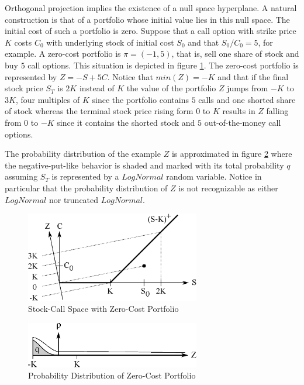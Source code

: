 Orthogonal projection implies the existence of a null space hyperplane. A natural construction is that of a portfolio whose initial value lies in this null space. The initial cost of such a portfolio is zero. Suppose that a call option with strike price $K$ costs $C_0$ with underlying stock of initial cost $S_0$ and that $S_0 / C_0 = 5$, for example. A zero-cost portfolio is $\pi = (-1,5)$, that is, sell one share of stock and buy $5$ call options. This situation is depicted in figure \ref{fig:SC_Zero}. The zero-cost portfolio is represented by $Z = -S + 5C$. Notice that $min(Z) = -K$ and that if the final stock price $S_T$ is $2K$ instead of $K$ the value of the portfolio $Z$ jumps from $-K$ to $3K$, four multiples of $K$ since the portfolio contains $5$ calls and one shorted share of stock whereas the terminal stock price rising form $0$ to $K$ results in $Z$ falling from $0$ to $-K$ since it contains the shorted stock and $5$ out-of-the-money call options. 

The probability distribution of the example $Z$ is approximated in figure \ref{fig:SC_Zero_RV} where the negative-put-like behavior is shaded and marked with its total probability $q$ assuming $S_T$ is represented by a $LogNormal$ random variable. Notice in particular that the probability distribution of $Z$ is not recognizable as either $LogNormal$ nor truncated $LogNormal$.

\begin{figure}
  \centering
  \includegraphics[width=3in]{Images/SC_Zero.eps}
  \caption[Stock-Call Space with Zero-Cost Portfolio]
          {Stock-Call Space with Zero-Cost Portfolio}
  \label{fig:SC_Zero}
\end{figure}

\begin{figure}
  \centering
  \includegraphics[width=3in]{Images/SC_Zero_RV.eps}
  \caption[Probability Distribution of Zero-Cost Portfolio]
          {Probability Distribution of Zero-Cost Portfolio}
  \label{fig:SC_Zero_RV}
\end{figure}


